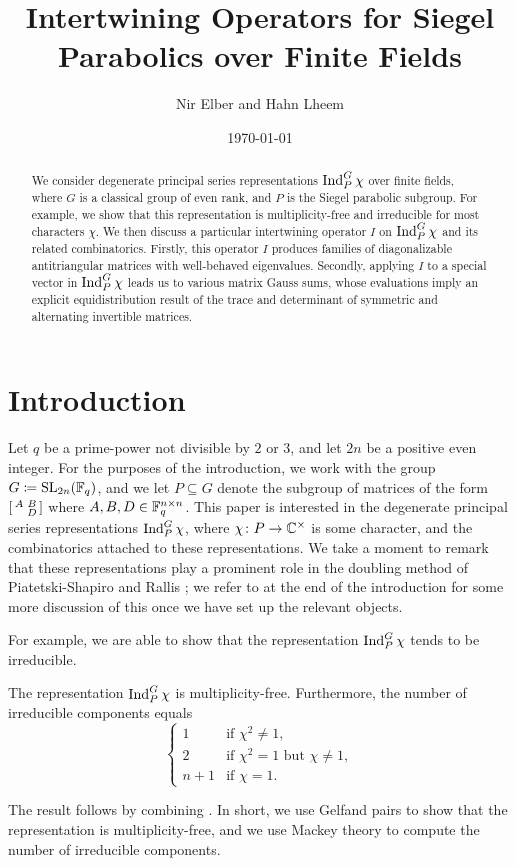 \documentclass{amsart}
\title{Intertwining Operators for Siegel Parabolics over Finite Fields}
\author{Nir Elber and Hahn Lheem}
\date{\today}
\begin{document}
\begin{abstract}
    We consider degenerate principal series representations $\operatorname{Ind}_P^G\chi$ over finite fields, where $G$ is a classical group of even rank, and $P$ is the Siegel parabolic subgroup. For example, we show that this representation is multiplicity-free and irreducible for most characters $\chi$. We then discuss a particular intertwining operator $I$ on $\operatorname{Ind}_P^G\chi$ and its related combinatorics. Firstly, this operator $I$ produces families of diagonalizable antitriangular matrices with well-behaved eigenvalues. Secondly, applying $I$ to a special vector in $\operatorname{Ind}_P^G\chi$ leads us to various matrix Gauss sums, whose evaluations imply an explicit equidistribution result of the trace and determinant of symmetric and alternating invertible matrices.
\end{abstract}

\maketitle


\tableofcontents

\section{Introduction}
Let $q$ be a prime-power not divisible by $2$ or $3$, and let $2n$ be a positive even integer. For the purposes of the introduction, we work with the group $G\coloneqq\operatorname{SL}_{2n}(\mathbb F_q)$, and we let $P\subseteq G$ denote the subgroup of matrices of the form $\begin{bsmallmatrix}
    A & B \\ & D
\end{bsmallmatrix}$ where $A,B,D\in\mathbb F_q^{n\times n}$. This paper is interested in the degenerate principal series representations $\operatorname{Ind}_P^G\chi$, where $\chi\colon P\to\mathbb C^\times$ is some character, and the combinatorics attached to these representations. We take a moment to remark that these representations play a prominent role in the doubling method of Piatetski-Shapiro and Rallis \cite{ps-r-doubling}; we refer to  at the end of the introduction for some more discussion of this once we have set up the relevant objects.

For example, we are able to show that the representation $\operatorname{Ind}_P^G\chi$ tends to be irreducible.
\begin{theorem}
    The representation $\operatorname{Ind}_P^G\chi$ is multiplicity-free. Furthermore, the number of irreducible components equals
    \[\begin{cases}
        1 & \text{if }\chi^2\ne1, \\
        2 & \text{if }\chi^2=1\text{ but }\chi\ne1, \\
        n+1 & \text{if }\chi=1.
    \end{cases}\]
\end{theorem}
The result follows by combining . In short, we use Gelfand pairs to show that the representation is multiplicity-free, and we use Mackey theory to compute the number of irreducible components.
\end{document}
